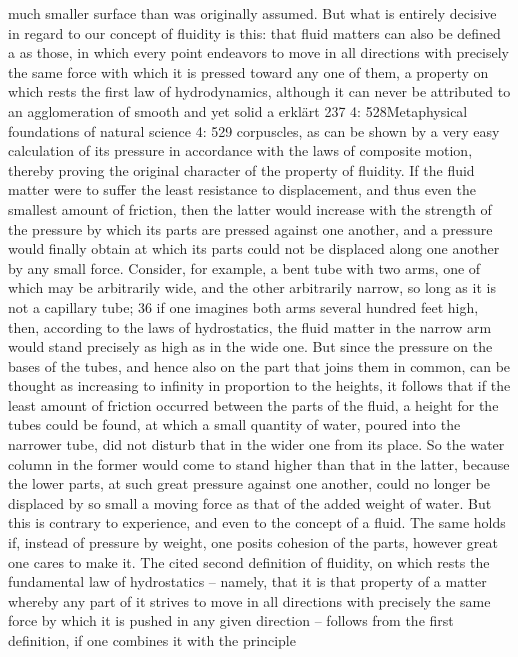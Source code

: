 much smaller surface than was originally assumed. But what is entirely
decisive in regard to our concept of ﬂuidity is this: that ﬂuid matters
can also be deﬁned a as those, in which every point endeavors to move in all
directions with precisely the same force with which it is pressed toward any one of
them, a property on which rests the ﬁrst law of hydrodynamics, although
it can never be attributed to an agglomeration of smooth and yet solid
a
erklärt
237
4: 528Metaphysical foundations of natural science
4: 529
corpuscles, as can be shown by a very easy calculation of its pressure
in accordance with the laws of composite motion, thereby proving the
original character of the property of ﬂuidity. If the ﬂuid matter were to
suffer the least resistance to displacement, and thus even the smallest
amount of friction, then the latter would increase with the strength of
the pressure by which its parts are pressed against one another, and a
pressure would ﬁnally obtain at which its parts could not be displaced
along one another by any small force. Consider, for example, a bent
tube with two arms, one of which may be arbitrarily wide, and the other
arbitrarily narrow, so long as it is not a capillary tube; 36 if one imagines
both arms several hundred feet high, then, according to the laws of
hydrostatics, the ﬂuid matter in the narrow arm would stand precisely
as high as in the wide one. But since the pressure on the bases of the
tubes, and hence also on the part that joins them in common, can be
thought as increasing to inﬁnity in proportion to the heights, it follows
that if the least amount of friction occurred between the parts of the
ﬂuid, a height for the tubes could be found, at which a small quantity of
water, poured into the narrower tube, did not disturb that in the wider
one from its place. So the water column in the former would come to
stand higher than that in the latter, because the lower parts, at such great
pressure against one another, could no longer be displaced by so small a
moving force as that of the added weight of water. But this is contrary to
experience, and even to the concept of a ﬂuid. The same holds if, instead
of pressure by weight, one posits cohesion of the parts, however great
one cares to make it. The cited second deﬁnition of ﬂuidity, on which
rests the fundamental law of hydrostatics – namely, that it is that property
of a matter whereby any part of it strives to move in all directions with
precisely the same force by which it is pushed in any given direction –
follows from the ﬁrst deﬁnition, if one combines it with the principle
